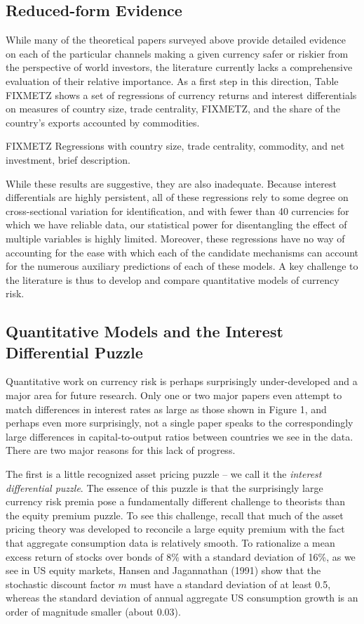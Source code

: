 \documentclass{ar-1col}
\begin{document}
\subsection{Reduced-form Evidence}

While many of the theoretical papers surveyed above provide detailed evidence on each of the particular channels making a given currency safer or riskier from the perspective of world investors, the literature currently lacks a comprehensive evaluation of their relative importance. As a first step in this direction, Table FIXMETZ shows a set of regressions of currency returns and interest differentials on measures of country size, trade centrality, FIXMETZ, and the share of the country's exports accounted by commodities.

FIXMETZ Regressions with country size, trade centrality, commodity, and net investment, brief description.

While these results are suggestive, they are also inadequate. Because interest differentials are highly persistent, all of these regressions rely to some degree on cross-sectional variation for identification, and with fewer than 40 currencies for which we have reliable data, our statistical power for disentangling the effect of multiple variables is highly limited. Moreover, these regressions have no way of accounting for the ease with which each of the candidate mechanisms can account for the numerous auxiliary predictions of each of these models. A key challenge to the literature is thus to develop and compare quantitative models of currency risk.

\subsection{Quantitative Models and the Interest Differential Puzzle}

Quantitative work on currency risk is perhaps surprisingly under-developed and a major area for future research. Only one or two major papers even attempt to match differences in interest rates as large as those shown in Figure 1, and perhaps even more surprisingly, not a single paper speaks to the correspondingly large differences in capital-to-output ratios between countries we see in the data. There are two major reasons for this lack of progress.

The first is a little recognized asset pricing puzzle -- we call it the \textit{interest differential puzzle}. The essence of this puzzle is that the surprisingly large currency risk premia pose a fundamentally different challenge to theorists than the equity premium puzzle. To see this challenge, recall that much of the asset pricing theory was developed to reconcile a large equity premium with the fact that aggregate consumption data is relatively smooth. To rationalize a mean excess return of stocks over bonds of 8\% with a standard deviation of 16\%, as we see in US equity markets, Hansen and Jagannathan (1991) show that the stochastic discount factor $m$ must have a standard deviation of at least 0.5, whereas the standard deviation of annual aggregate US consumption growth is an order of magnitude smaller (about 0.03).  
\end{document}
